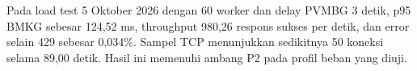 Pada load test 5 Oktober 2026 dengan 60 worker dan delay PVMBG 3 detik, p95 BMKG sebesar 124,52 ms, throughput 980,26 respons sukses per detik, dan error selain 429 sebesar 0,034\%. Sampel TCP menunjukkan sedikitnya 50 koneksi selama 89,00 detik. Hasil ini memenuhi ambang P2 pada profil beban yang diuji.
